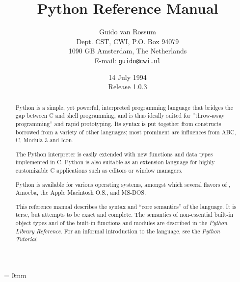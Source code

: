 
\title{Python Reference Manual}

\author{
	Guido van Rossum \\
	Dept. CST, CWI, P.O. Box 94079 \\
	1090 GB Amsterdam, The Netherlands \\
	E-mail: {\tt guido@cwi.nl}
}

\date{14 July 1994 \\ Release 1.0.3} %

\makeindex




\maketitle

\begin{abstract}

\noindent
Python is a simple, yet powerful, interpreted programming language
that bridges the gap between C and shell programming, and is thus
ideally suited for ``throw-away programming'' and rapid prototyping.
Its syntax is put together from constructs borrowed from a variety of
other languages; most prominent are influences from ABC, C, Modula-3
and Icon.

The Python interpreter is easily extended with new functions and data
types implemented in C.  Python is also suitable as an extension
language for highly customizable C applications such as editors or
window managers.

Python is available for various operating systems, amongst which
several flavors of {\UNIX}, Amoeba, the Apple Macintosh O.S.,
and MS-DOS.

This reference manual describes the syntax and ``core semantics'' of
the language.  It is terse, but attempts to be exact and complete.
The semantics of non-essential built-in object types and of the
built-in functions and modules are described in the {\em Python
Library Reference}.  For an informal introduction to the language, see
the {\em Python Tutorial}.

\end{abstract}

\pagebreak

{
\parskip = 0mm
\tableofcontents
}

\pagebreak






